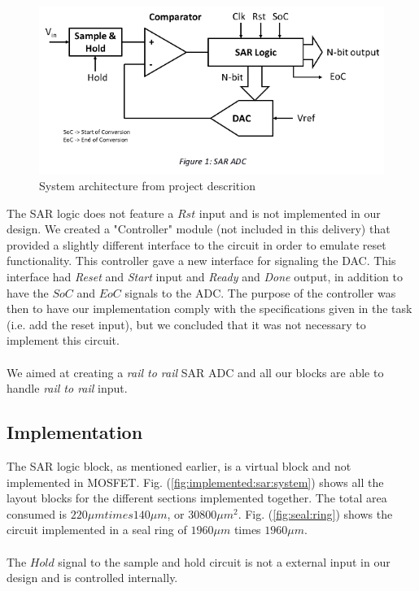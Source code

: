 \documentclass[english, 12pt, a4paper]{ifimaster}
\begin{document}
\begin{figure}[!ht]
 \centering
 \includegraphics[width=\textwidth]{img/sar_architecture_project_descriotion}
 \caption{System architecture from project descrition}
 \label{fig:system:architecture:desc}
\end{figure}

The SAR logic does not feature a \(Rst\) input and is not implemented in our design. 
We created a "Controller" module (not included in this delivery) that provided a slightly different interface to the circuit in order to emulate reset functionality.
This controller gave a new interface for signaling the DAC.
This interface had \textit{Reset} and \textit{Start} input and \textit{Ready} and \textit{Done} output, in addition to have the \(SoC\) and \(EoC\) signals to the ADC.
The purpose of the controller was then to have our implementation comply with the specifications given in the task (i.e. add the reset input), but we concluded that it 
was not necessary to implement this circuit.\\
\\
We aimed at creating a \textit{rail to rail} SAR ADC and all our blocks are able to handle \textit{rail to rail} input.

\subsection{Implementation}
The SAR logic block, as mentioned earlier, is a virtual block and not implemented in MOSFET. 
Fig. (\ref{fig:implemented:sar:system}) shows all the layout blocks for the different sections
implemented together. The total area consumed is \(220 \mu m times 140 \mu m\), or \(30 800 \mu m^2\). 
Fig. (\ref{fig:seal:ring}) shows the circuit implemented in a seal ring of \(1960 \mu m\) times 
\(1960 \mu m\). \\
\\
The \(Hold\) signal to the sample and hold circuit is not a external 
input in our design and is controlled internally. 
\end{document}
